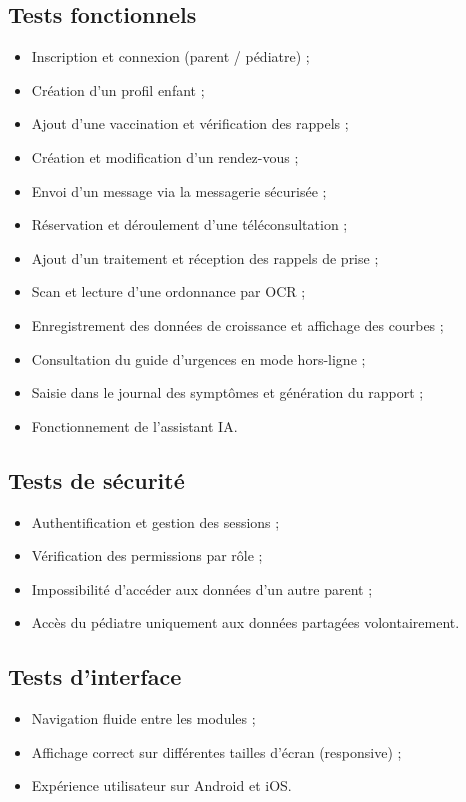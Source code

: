 \documentclass[11pt,a4paper]{article}
\begin{document}
\subsection{Tests fonctionnels}
\begin{itemize}
  \item Inscription et connexion (parent / pédiatre) ;
  \item Création d'un profil enfant ;
  \item Ajout d'une vaccination et vérification des rappels ;
  \item Création et modification d'un rendez-vous ;
  \item Envoi d'un message via la messagerie sécurisée ;
  \item Réservation et déroulement d'une téléconsultation ;
  \item Ajout d'un traitement et réception des rappels de prise ;
  \item Scan et lecture d'une ordonnance par OCR ;
  \item Enregistrement des données de croissance et affichage des courbes ;
  \item Consultation du guide d'urgences en mode hors-ligne ;
  \item Saisie dans le journal des symptômes et génération du rapport ;
  \item Fonctionnement de l'assistant IA.
\end{itemize}

\subsection{Tests de sécurité}
\begin{itemize}
  \item Authentification et gestion des sessions ;
  \item Vérification des permissions par rôle ;
  \item Impossibilité d'accéder aux données d'un autre parent ;
  \item Accès du pédiatre uniquement aux données partagées volontairement.
\end{itemize}

\subsection{Tests d'interface}
\begin{itemize}
  \item Navigation fluide entre les modules ;
  \item Affichage correct sur différentes tailles d'écran (responsive) ;
  \item Expérience utilisateur sur Android et iOS.
\end{itemize}
\end{document}
